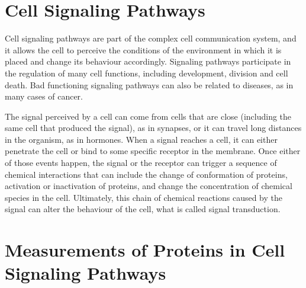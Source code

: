 
\section{Cell Signaling Pathways}
Cell signaling pathways are part of the complex cell communication 
system, and it allows the cell to perceive the conditions of the 
environment in which it is placed and change its behaviour accordingly.
Signaling pathways participate in the regulation of many cell functions,
including development, division and cell death. Bad functioning 
signaling pathways can also be related to diseases, as in many cases of
cancer.

The signal perceived by a cell can come from cells that are close 
(including the same cell that produced the signal), as in synapses, or 
it can travel long distances in the organism, as in hormones. When a 
signal reaches a cell, it can either penetrate the cell or bind to some 
specific receptor in the membrane. Once either of those events happen, 
the signal or the receptor can trigger a sequence of chemical 
interactions that can include the change of conformation of proteins, 
activation or inactivation of proteins, and change the concentration of
chemical species in the cell. Ultimately, this chain of chemical 
reactions caused by the signal can alter the behaviour of the cell, what 
is called signal transduction.

\section{Measurements of Proteins in Cell Signaling Pathways}
